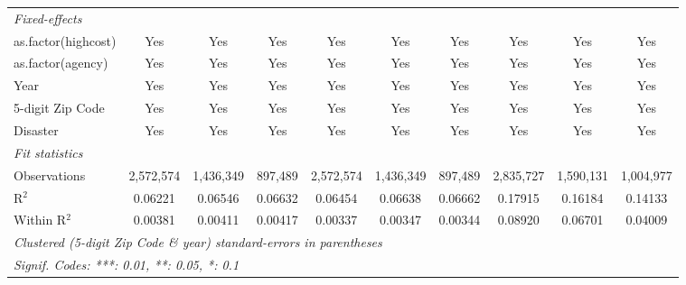 \begin{tabular}{lccccccccc}
   \midrule
   \emph{Fixed-effects}\\
   as.factor(highcost)                                        & Yes            & Yes             & Yes            & Yes           & Yes            & Yes            & Yes          & Yes          & Yes\\  
   as.factor(agency)                                          & Yes            & Yes             & Yes            & Yes           & Yes            & Yes            & Yes          & Yes          & Yes\\  
   Year                                                       & Yes            & Yes             & Yes            & Yes           & Yes            & Yes            & Yes          & Yes          & Yes\\  
   5-digit Zip Code                                           & Yes            & Yes             & Yes            & Yes           & Yes            & Yes            & Yes          & Yes          & Yes\\  
   Disaster                                                   & Yes            & Yes             & Yes            & Yes           & Yes            & Yes            & Yes          & Yes          & Yes\\  
   \midrule
   \emph{Fit statistics}\\
   Observations                                               & 2,572,574      & 1,436,349       & 897,489        & 2,572,574     & 1,436,349      & 897,489        & 2,835,727    & 1,590,131    & 1,004,977\\  
   R$^2$                                                      & 0.06221        & 0.06546         & 0.06632        & 0.06454       & 0.06638        & 0.06662        & 0.17915      & 0.16184      & 0.14133\\  
   Within R$^2$                                               & 0.00381        & 0.00411         & 0.00417        & 0.00337       & 0.00347        & 0.00344        & 0.08920      & 0.06701      & 0.04009\\  
   \midrule \midrule
   \multicolumn{10}{l}{\emph{Clustered (5-digit Zip Code \& year) standard-errors in parentheses}}\\
   \multicolumn{10}{l}{\emph{Signif. Codes: ***: 0.01, **: 0.05, *: 0.1}}\\
\end{tabular}
\par\endgroup
